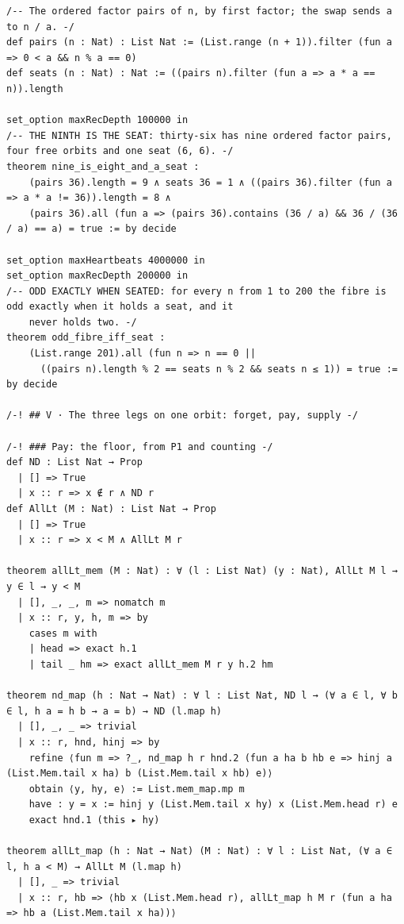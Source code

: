 \documentclass[10pt,twocolumn]{article}
\begin{document}
\begin{Verbatim}
/-- The ordered factor pairs of n, by first factor; the swap sends a to n / a. -/
def pairs (n : Nat) : List Nat := (List.range (n + 1)).filter (fun a => 0 < a && n % a == 0)
def seats (n : Nat) : Nat := ((pairs n).filter (fun a => a * a == n)).length

set_option maxRecDepth 100000 in
/-- THE NINTH IS THE SEAT: thirty-six has nine ordered factor pairs, four free orbits and one seat (6, 6). -/
theorem nine_is_eight_and_a_seat :
    (pairs 36).length = 9 ∧ seats 36 = 1 ∧ ((pairs 36).filter (fun a => a * a != 36)).length = 8 ∧
    (pairs 36).all (fun a => (pairs 36).contains (36 / a) && 36 / (36 / a) == a) = true := by decide

set_option maxHeartbeats 4000000 in
set_option maxRecDepth 200000 in
/-- ODD EXACTLY WHEN SEATED: for every n from 1 to 200 the fibre is odd exactly when it holds a seat, and it
    never holds two. -/
theorem odd_fibre_iff_seat :
    (List.range 201).all (fun n => n == 0 ||
      ((pairs n).length % 2 == seats n % 2 && seats n ≤ 1)) = true := by decide

/-! ## V · The three legs on one orbit: forget, pay, supply -/

/-! ### Pay: the floor, from P1 and counting -/
def ND : List Nat → Prop
  | [] => True
  | x :: r => x ∉ r ∧ ND r
def AllLt (M : Nat) : List Nat → Prop
  | [] => True
  | x :: r => x < M ∧ AllLt M r

theorem allLt_mem (M : Nat) : ∀ (l : List Nat) (y : Nat), AllLt M l → y ∈ l → y < M
  | [], _, _, m => nomatch m
  | x :: r, y, h, m => by
    cases m with
    | head => exact h.1
    | tail _ hm => exact allLt_mem M r y h.2 hm

theorem nd_map (h : Nat → Nat) : ∀ l : List Nat, ND l → (∀ a ∈ l, ∀ b ∈ l, h a = h b → a = b) → ND (l.map h)
  | [], _, _ => trivial
  | x :: r, hnd, hinj => by
    refine ⟨fun m => ?_, nd_map h r hnd.2 (fun a ha b hb e => hinj a (List.Mem.tail x ha) b (List.Mem.tail x hb) e)⟩
    obtain ⟨y, hy, e⟩ := List.mem_map.mp m
    have : y = x := hinj y (List.Mem.tail x hy) x (List.Mem.head r) e
    exact hnd.1 (this ▸ hy)

theorem allLt_map (h : Nat → Nat) (M : Nat) : ∀ l : List Nat, (∀ a ∈ l, h a < M) → AllLt M (l.map h)
  | [], _ => trivial
  | x :: r, hb => ⟨hb x (List.Mem.head r), allLt_map h M r (fun a ha => hb a (List.Mem.tail x ha))⟩


\end{Verbatim}
\end{document}
